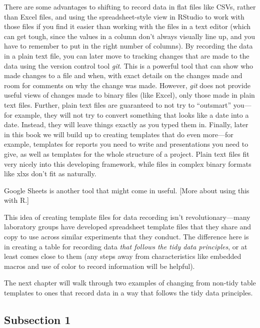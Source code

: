 \documentclass[]{tufte-book}
\begin{document}
There are some advantages to shifting to record data in flat files like CSVs,
rather than Excel files, and using the spreadsheet-style view in RStudio to work
with those files if you find it easier than working with the files in a text
editor (which can get tough, since the values in a column don't always visually
line up, and you have to remember to put in the right number of columns). By
recording the data in a plain text file, you can later move to tracking changes
that are made to the data using the version control tool \emph{git}. This is a
powerful tool that can show who made changes to a file and when, with exact
details on the changes made and room for comments on why the change was made.
However, \emph{git} does not provide useful views of changes made to binary files
(like Excel), only those made in plain text files. Further, plain text files are
guaranteed to not try to ``outsmart'' you---for example, they will not try to
convert something that looks like a date into a date. Instead, they will leave
things exactly as you typed them in. Finally, later in this book we will build
up to creating templates that do even more---for example, templates for reports
you need to write and presentations you need to give, as well as templates for
the whole structure of a project. Plain text files fit very nicely into this
developing framework, while files in complex binary formats like xlxs don't fit
as naturally.

Google Sheets is another tool that might come in useful. {[}More about using this
with R.{]}

This idea of creating template files for data recording isn't
revolutionary---many laboratory groups have developed spreadsheet template files
that they share and copy to use across similar experiments that they conduct.
The difference here is in creating a table for recording data \emph{that follows the
tidy data principles}, or at least comes close to them (any steps away from
characteristics like embedded macros and use of color to record information will
be helpful).

The next chapter will walk through two examples of changing from non-tidy table
templates to ones that record data in a way that follows the tidy data
principles.

\hypertarget{subsection-1}{%
\subsection{Subsection 1}\label{subsection-1}}
\end{document}
